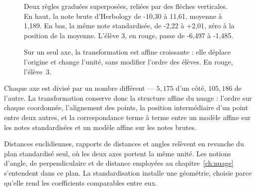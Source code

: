 \begin{figure}[htbp]
\centering
\begin{graphique}{Deux règles graduées superposées, reliées par des flèches verticales. En haut, la note brute d'Herbology de -10,30 à 11,61, moyenne à 1,189. En bas, la même note standardisée, de -2,22 à +2,01, zéro à la position de la moyenne. L'élève 3, en rouge, passe de -6,497 à -1,485.}
\end{graphique}
\caption{Sur un seul axe, la transformation est affine croissante : elle déplace
l'origine et change l'unité, sans modifier l'ordre des élèves. En rouge,
l'élève~$3$.}
\label{fig:graduation}
\end{figure}
\FloatBarrier

Chaque axe est divisé par un nombre différent --- $5{,}175$ d'un côté,
$105{,}186$ de l'autre. La transformation conserve donc la structure affine du
nuage : l'ordre sur chaque coordonnée, l'alignement des points, la position
intermédiaire d'un point entre deux autres, et la correspondance terme à terme
entre un modèle affine sur les notes standardisées et un modèle affine sur les
notes brutes.

Distances euclidiennes, rapports de distances et angles relèvent en revanche du
plan standardisé seul, où les deux axes portent la même unité. Les notions
d'angle, de perpendiculaire et de distance employées au chapitre~\ref{ch:nuage}
s'entendent dans ce plan. La standardisation installe une géométrie, choisie
parce qu'elle rend les coefficients comparables entre eux.

